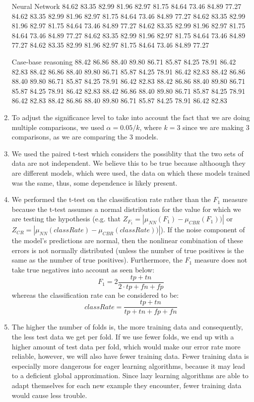 \documentclass[a4paper,12pt,oneside,final]{report}
\begin{document}
\begin{enumerate}
Neural Network
84.62 83.35 82.99 81.96 82.97 81.75 84.64 73.46 84.89 77.27 
84.62 83.35 82.99 81.96 82.97 81.75 84.64 73.46 84.89 77.27 
84.62 83.35 82.99 81.96 82.97 81.75 84.64 73.46 84.89 77.27 
84.62 83.35 82.99 81.96 82.97 81.75 84.64 73.46 84.89 77.27 
84.62 83.35 82.99 81.96 82.97 81.75 84.64 73.46 84.89 77.27 
84.62 83.35 82.99 81.96 82.97 81.75 84.64 73.46 84.89 77.27 

Case-base reasoning
88.42  86.86  88.40  89.80  86.71  85.87  84.25  78.91  86.42  82.83 
88.42  86.86  88.40  89.80  86.71  85.87  84.25  78.91  86.42  82.83 
88.42  86.86  88.40  89.80  86.71  85.87  84.25  78.91  86.42  82.83 
88.42  86.86  88.40  89.80  86.71  85.87  84.25  78.91  86.42  82.83 
88.42  86.86  88.40  89.80  86.71  85.87  84.25  78.91  86.42  82.83 
88.42  86.86  88.40  89.80  86.71  85.87  84.25  78.91  86.42  82.83 


\item To adjust the significance level to take into account the fact that we are doing multiple comparisons, we used $\alpha = 0.05 / k$, where $k = 3$ since we are making 3 comparisons, as we are comparing the 3 models.

\item We used the paired t-test which considers the possiblity that the two sets of data are not independent.  We believe this to be true because althoough they are different models, which were used, the data on which these models trained was the same, thus, some dependence is likely present.

\item We performed the t-test on the classification rate rather than the $F_1$ measure because the t-test assumes a normal distribution for the value for which we are testing the hypothesis (e.g. that $Z_{F_1} = |\mu_{NN}(F_1) - \mu_{CBR}(F_1))|$ or $Z_{CR} = |\mu_{NN}(classRate) - \mu_{CBR}(classRate))|$).  If the noise component of the model's predictions are normal, then the nonlinear combination of these errors is not normally distributed (unless the number of true positives is the same as the number of true positives).  Furthermore, the $F_1$ measure does not take true negatives into account as seen below:
$$
F_1 = 2\frac{tp + tn}{2\cdot tp + fn + fp}
$$
whereas the classification rate can be considered to be:
$$
classRate = \frac{tp + tn}{tp + tn + fp + fn}
$$
\item The higher the number of folds is, the more training data and consequently, the less test data we get per fold. If we use fewer folds, we end up with a higher amount of test data per fold, which would make our error rate more reliable, however, we will also have fewer training data. Fewer training data is especially more dangerous for eager learning algorithms, because it may lead to a deficient global approximation. Since lazy learning algorithms are able to adapt themselves for each new example they encounter, fewer training data would cause less trouble.


\end{enumerate}
\end{document}
